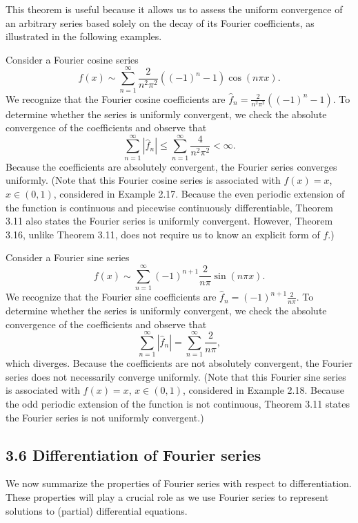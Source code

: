 This theorem is useful because it allows us to assess the uniform convergence of an arbitrary series based solely on the decay of its Fourier coefficients, as illustrated in the following examples.

\begin{example}[][3.17]
    Consider a Fourier cosine series
    \[f(x) \sim \sum_{n=1}^{\infty} \frac{2}{n^2\pi^2} ((-1)^n - 1) \cos(n\pi x).\]
    We recognize that the Fourier cosine coefficients are $\hat{f}_n = \frac{2}{n^2\pi^2} ((-1)^n - 1)$. To determine whether the series is uniformly convergent, we check the absolute convergence of the coefficients and observe that
    \[\sum_{n=1}^{\infty} |\hat{f}_n| \leq \sum_{n=1}^{\infty} \frac{4}{n^2\pi^2} < \infty.\]
    Because the coefficients are absolutely convergent, the Fourier series converges uniformly. (Note that this Fourier cosine series is associated with $f(x) = x$, $x \in (0, 1)$, considered in Example 2.17. Because the even periodic extension of the function is continuous and piecewise continuously differentiable, Theorem 3.11 also states the Fourier series is uniformly convergent. However, Theorem 3.16, unlike Theorem 3.11, does not require us to know an explicit form of $f$.)
\end{example}

\begin{example}[][3.18]
    Consider a Fourier sine series
    \[f(x) \sim \sum_{n=1}^{\infty} (-1)^{n+1} \frac{2}{n\pi} \sin(n\pi x).\]
    We recognize that the Fourier sine coefficients are $\hat{f}_n = (-1)^{n+1} \frac{2}{n\pi}$. To determine whether the series is uniformly convergent, we check the absolute convergence of the coefficients and observe that
    \[\sum_{n=1}^{\infty} |\hat{f}_n| = \sum_{n=1}^{\infty} \frac{2}{n\pi},\]
    which diverges. Because the coefficients are not absolutely convergent, the Fourier series does not necessarily converge uniformly. (Note that this Fourier sine series is associated with $f(x) = x$, $x \in (0, 1)$, considered in Example 2.18. Because the odd periodic extension of the function is not continuous, Theorem 3.11 states the Fourier series is not uniformly convergent.)
\end{example}

\subsection{3.6 Differentiation of Fourier series}
We now summarize the properties of Fourier series with respect to differentiation. These properties will play a crucial role as we use Fourier series to represent solutions to (partial) differential equations.

